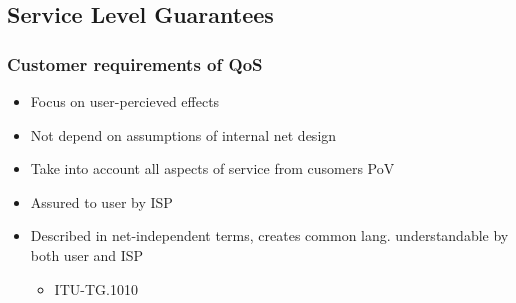\subsection{Service Level Guarantees}
\subsubsection{Customer requirements of QoS}
\begin{itemize}
	\item Focus on user-percieved effects
	\item Not depend on assumptions of internal net design
	\item Take into account all aspects of service from cusomers PoV
	\item Assured to user by ISP
	\item Described in net-independent terms, creates common lang.
		understandable by both user and ISP
	\begin{itemize}
		\item ITU-TG.1010
	\end{itemize}
\end{itemize}
